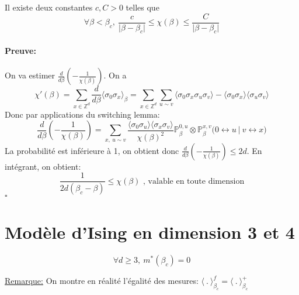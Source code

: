 \documentclass[a4paper,12pt]{report}
\newenvironment{preuve}{\paragraph{Preuve:}}{\hfill$\square$}
\begin{document}
\begin{thm} Il existe deux constantes $c, C > 0$ telles que
$$
\forall \beta < \beta_c, \ \frac{c}{\vert \beta - \beta_c \vert} \leq \chi(\beta) \leq \frac{C}{\vert \beta - \beta_c \vert}
$$
\end{thm}

\begin{preuve}
On va estimer $\frac{d}{d \beta} ( - \frac{1}{\chi(\beta)} )$. On a
$$
\chi'(\beta) = \sum_{x \in \mathbb{Z}^d} \frac{d}{d\beta} \langle \sigma_0 \sigma_x \rangle_{\beta}
= \sum_{x \in \mathbb{Z}^d} \sum_{u \sim v} \langle \sigma_0 \sigma_x \sigma_u \sigma_v \rangle - \langle \sigma_0 \sigma_x \rangle \langle \sigma_u \sigma_v \rangle
$$
Donc par applications du switching lemma:
$$
\frac{d}{d \beta} ( - \frac{1}{\chi(\beta)} ) = \sum_{x, \ u \sim v} \frac{\langle \sigma_0 \sigma_u \rangle \langle \sigma_x \sigma_v \rangle}{\chi(\beta)^2} \mathbb{P}_{\beta}^{0,u} \otimes \mathbb{P}_{\beta}^{x,v} \big( 0 \leftrightarrow u \ \vert \ v \leftrightarrow x \big)
$$
La probabilité est inférieure à 1, on obtient donc $\frac{d}{d \beta} ( - \frac{1}{\chi(\beta)} ) \leq 2d$. En intégrant, on obtient:
$$
\frac{1}{2d(\beta_c - \beta)} \leq \chi(\beta) \text{  , valable en toute dimension}
$$
\end{preuve}

\section{Modèle d'Ising en dimension 3 et 4}

\begin{thm}
$$
\forall d \geq 3, \ m^*(\beta_c) = 0
$$
\end{thm}

\underline{Remarque:} On montre en réalité l'égalité des mesures: $\langle \ . \ \rangle_{\beta_c}^f = \langle \ . \ \rangle_{\beta_c}^+$
\end{document}
